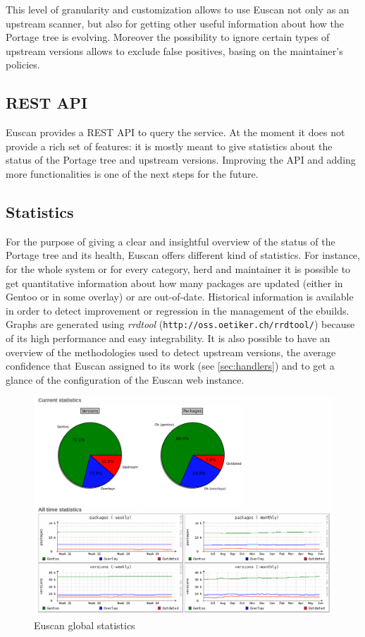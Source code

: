 This level of granularity and customization allows to use Euscan not only as an upstream scanner, but also for getting other useful information about how the Portage tree is evolving. Moreover the possibility to ignore certain types of upstream versions allows to exclude false positives, basing on the maintainer's policies.


\subsection{REST API}
Euscan provides a REST API to query the service. At the moment it does not provide a rich set of features: it is mostly meant to give statistics about the status of the Portage tree and upstream versions.
Improving the API and adding more functionalities is one of the next steps for the future.


\subsection{Statistics}
For the purpose of giving a clear and insightful overview of the status of the Portage tree and its health, Euscan offers different kind of statistics.
For instance, for the whole system or for every category, herd and maintainer it is possible to get quantitative information about how many packages are updated (either in Gentoo or in some overlay) or are out-of-date. Historical information is available in order to detect improvement or regression in the management of the ebuilds.
Graphs are generated using \emph{rrdtool} (\texttt{http://oss.oetiker.ch/rrdtool/}) because of its high performance and easy integrability.
It is also possible to have an overview of the methodologies used to detect upstream versions, the average confidence that Euscan assigned to its work (see \ref{sec:handlers}) and to get a glance of the configuration of the Euscan web instance.

\begin{figure}[h!]
  \centering
    \includegraphics[width=13.5cm,natwidth=1030,natheight=754]{img/statistics.png}
  \caption{Euscan global statistics}
\end{figure}


